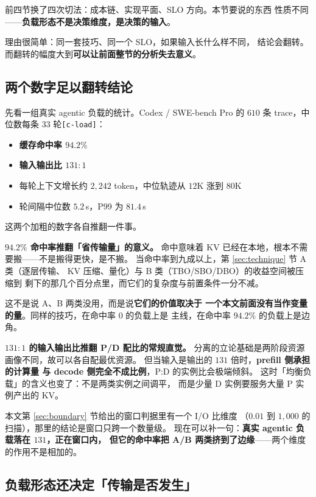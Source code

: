 前四节换了四次切法：成本链、实现平面、SLO 方向。本节要说的东西
性质不同——\textbf{负载形态不是决策维度，是决策的输入}。

理由很简单：同一套技巧、同一个 SLO，如果输入长什么样不同，
结论会翻转。而翻转的幅度大到\textbf{可以让前面整节的分析失去意义}。

\subsection{两个数字足以翻转结论}

先看一组真实 agentic 负载的统计。Codex / SWE-bench Pro 的
$610$ 条 trace，中位数每条 $33$ 轮\texttt{[c-load]}：

\begin{itemize}[leftmargin=1.3em,itemsep=1.5pt,topsep=2pt]
  \item \textbf{缓存命中率 $94.2\%$}
  \item \textbf{输入输出比 $131:1$}
  \item 每轮上下文增长约 $2{,}242$ token，中位轨迹从 $12$K 涨到 $80$K
  \item 轮间隔中位数 $5.2$\,s，P99 为 $81.4$\,s
\end{itemize}

\noindent 这两个加粗的数字各自推翻一件事。

\noindent\textbf{$94.2\%$ 命中率推翻「省传输量」的意义。} 命中意味着
KV 已经在本地，根本不需要搬——不是搬得更快，是不搬。
当命中率到九成以上，第 \ref{sec:technique} 节 A 类（逐层传输、
KV 压缩、量化）与 B 类（TBO/SBO/DBO）的收益空间被压缩到
剩下的那几个百分点里，而它们的复杂度与前置条件一分不减。

\noindent 这不是说 A、B 两类没用，而是说\textbf{它们的价值取决于
一个本文前面没有当作变量的量}。同样的技巧，在命中率 $0$ 的负载上是
主线，在命中率 $94.2\%$ 的负载上是边角。

\noindent\textbf{$131:1$ 的输入输出比推翻 P/D 配比的常规直觉。}
分离的立论基础是两阶段资源画像不同，故可以各自配最优资源。
但当输入是输出的 $131$ 倍时，\textbf{prefill 侧承担的计算量
与 decode 侧完全不成比例}，P:D 的实例比会极端倾斜。
这时「均衡负载」的含义也变了：不是两类实例之间调平，
而是少量 D 实例要服务大量 P 实例产出的 KV。

\noindent 本文第 \ref{sec:boundary} 节给出的窗口判据里有一个 I/O 比维度
（$0.01$ 到 $1{,}000$ 的扫描），那里的结论是窗口只跨一个数量级。
现在可以补一句：\textbf{真实 agentic 负载落在 $131$，正在窗口内，
但它的命中率把 A/B 两类挤到了边缘}——两个维度的作用不是相加的。

\subsection{负载形态还决定「传输是否发生」}

